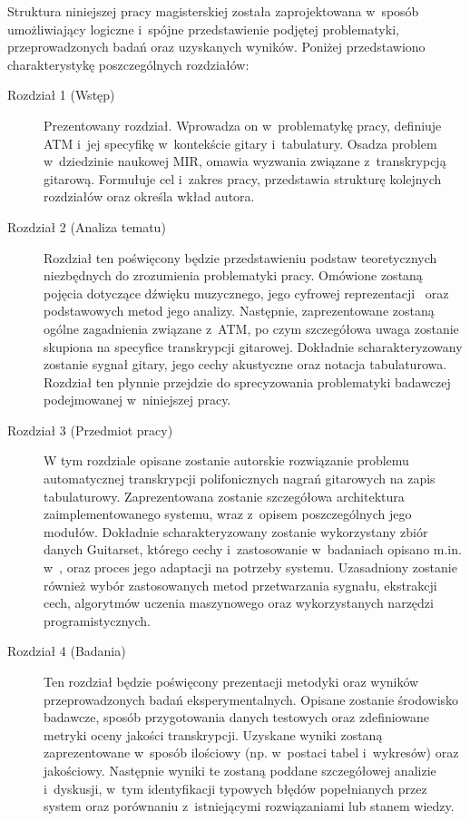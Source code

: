 Struktura niniejszej pracy magisterskiej została zaprojektowana w~sposób umożliwiający logiczne i~spójne przedstawienie podjętej problematyki, przeprowadzonych badań oraz uzyskanych wyników. Poniżej przedstawiono charakterystykę poszczególnych rozdziałów:
\begin{description}
    \item[Rozdział 1 (Wstęp)] Prezentowany rozdział. Wprowadza on w~problematykę pracy, definiuje ATM i~jej specyfikę w~kontekście gitary i~tabulatury. Osadza problem w~dziedzinie naukowej MIR, omawia wyzwania związane z~transkrypcją gitarową. Formułuje cel i~zakres pracy, przedstawia strukturę kolejnych rozdziałów oraz określa wkład autora.
    \item[Rozdział 2 (Analiza tematu)] Rozdział ten poświęcony będzie przedstawieniu podstaw teoretycznych niezbędnych do zrozumienia problematyki pracy. Omówione zostaną pojęcia dotyczące dźwięku muzycznego, jego cyfrowej reprezentacji~\autocite{KlapuriDavy2006SignalProcessing} oraz podstawowych metod jego analizy. Następnie, zaprezentowane zostaną ogólne zagadnienia związane z~ATM, po czym szczegółowa uwaga zostanie skupiona na specyfice transkrypcji gitarowej. Dokładnie scharakteryzowany zostanie sygnał gitary, jego cechy akustyczne oraz notacja tabulaturowa. Rozdział ten płynnie przejdzie do sprecyzowania problematyki badawczej podejmowanej w~niniejszej pracy.
    \item[Rozdział 3 (Przedmiot pracy)] W tym rozdziale opisane zostanie autorskie rozwiązanie problemu automatycznej transkrypcji polifonicznych nagrań gitarowych na zapis tabulaturowy. Zaprezentowana zostanie szczegółowa architektura zaimplementowanego systemu, wraz z~opisem poszczególnych jego modułów. Dokładnie scharakteryzowany zostanie wykorzystany zbiór danych Guitarset, którego cechy i~zastosowanie w~badaniach opisano m.in. w~\autocite{Wiggins2019TabCNN}, oraz proces jego adaptacji na potrzeby systemu. Uzasadniony zostanie również wybór zastosowanych metod przetwarzania sygnału, ekstrakcji cech, algorytmów uczenia maszynowego oraz wykorzystanych narzędzi programistycznych.
    \item[Rozdział 4 (Badania)] Ten rozdział będzie poświęcony prezentacji metodyki oraz wyników przeprowadzonych badań eksperymentalnych. Opisane zostanie środowisko badawcze, sposób przygotowania danych testowych oraz zdefiniowane metryki oceny jakości transkrypcji. Uzyskane wyniki zostaną zaprezentowane w~sposób ilościowy (np. w~postaci tabel i~wykresów) oraz jakościowy. Następnie wyniki te zostaną poddane szczegółowej analizie i~dyskusji, w~tym identyfikacji typowych błędów popełnianych przez system oraz porównaniu z~istniejącymi rozwiązaniami lub stanem wiedzy.

\end{description}
